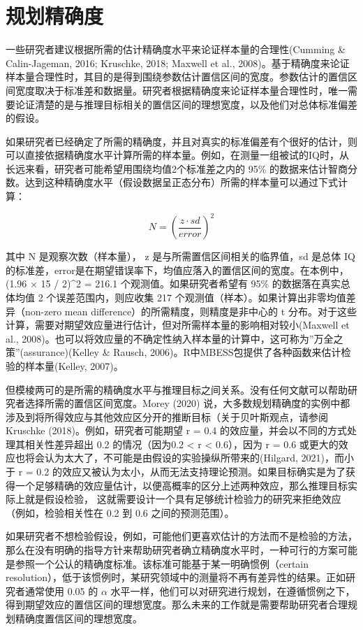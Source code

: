 \documentclass[
  letterpaper,
  DIV=11,
  numbers=noendperiod]{scrreprt}
\begin{document}
\hypertarget{planprecision}{%
\section{规划精确度}\label{planprecision}}

一些研究者建议根据所需的估计精确度水平来论证样本量的合理性(Cumming \&
Calin-Jageman, 2016; Kruschke, 2018; Maxwell et al.,
2008)。基于精确度来论证样本量合理性时，其目的是得到围绕参数估计置信区间的宽度。参数估计的置信区间宽度取决于标准差和数据量。研究者根据精确度来论证样本量合理性时，唯一需要论证清楚的是与推理目标相关的置信区间的理想宽度，以及他们对总体标准偏差的假设。

如果研究者已经确定了所需的精确度，并且对真实的标准偏差有个很好的估计，则可以直接依据精确度水平计算所需的样本量。例如，在测量一组被试的IQ时，从长远来看，研究者可能希望用围绕均值2个标准差之内的
95\%
的数据来估计智商分数。达到这种精确度水平（假设数据呈正态分布）所需的样本量可以通过下式计算：

\[N = \left(\frac{z \cdot sd}{error}\right)^2\]

其中 N 是观察次数（样本量）， z 是与所需置信区间相关的临界值，sd 是总体
IQ
的标准差，error是在期望错误率下，均值应落入的置信区间的宽度。在本例中，(1.96
× 15 / 2)\^{}2 = 216.1 个观测值。如果研究者希望有 95\%
的数据落在真实总体均值 2 个误差范围内，则应收集 217
个观测值（样本）。如果计算出非零均值差异（non-zero mean
difference）的所需精度，则精度是非中心的 t
分布。对于这些计算，需要对期望效应量进行估计，但对所需样本量的影响相对较小(Maxwell
et al.,
2008)。也可以将效应量的不确定性纳入样本量的计算中，这可称为''万全之策''(assurance)(Kelley
\& Rausch, 2006)。R中MBESS包提供了各种函数来估计检验的样本量(Kelley,
2007)。

但模棱两可的是所需的精确度水平与推理目标之间关系。没有任何文献可以帮助研究者选择所需的置信区间宽度。Morey
(2020)
说，大多数规划精确度的实例中都涉及到将所得效应与其他效应区分开的推断目标（关于贝叶斯观点，请参阅
Kruschke (2018)。例如，研究者可能期望 r = 0.4
的效应量，并会以不同的方式处理其相关性差异超出 0.2 的情况（因为0.2
\textless{} r \textless{} 0.6），因为 r = 0.6
或更大的效应也将会认为太大了，不可能是由假设的实验操纵所带来的(Hilgard,
2021)，而小于 r = 0.2
的效应又被认为太小，从而无法支持理论预测。如果目标确实是为了获得一个足够精确的效应量估计，以便高概率的区分上述两种效应，那么推理目标实际上就是假设检验，
这就需要设计一个具有足够统计检验力的研究来拒绝效应（例如，检验相关性在
0.2 到 0.6 之间的预测范围）。

如果研究者不想检验假设，例如，可能他们更喜欢估计的方法而不是检验的方法，那么在没有明确的指导方针来帮助研究者确立精确度水平时，一种可行的方案可能是参照一个公认的精确度标准。该标准可能基于某一明确惯例（certain
resolution），低于该惯例时，某研究领域中的测量将不再有差异性的结果。正如研究者通常使用
0.05 的 \(\alpha\)
水平一样，他们可以对研究进行规划，在遵循惯例之下，得到期望效应的置信区间的理想宽度。那么未来的工作就是需要帮助研究者合理规划精确度置信区间的理想宽度。
\end{document}
